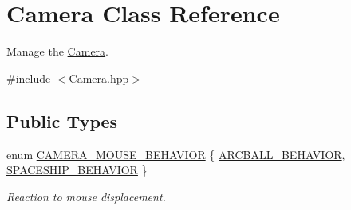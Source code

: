 \hypertarget{classCamera}{\section{Camera Class Reference}
\label{classCamera}
}


Manage the \hyperlink{classCamera}{Camera}.  




{\ttfamily \#include $<$Camera.\+hpp$>$}

\subsection*{Public Types}
\begin{DoxyCompactItemize}
\item 
enum \hyperlink{classCamera_a39b92a45686a6f858a3405ee34a95cfa}{C\+A\+M\+E\+R\+A\+\_\+\+M\+O\+U\+S\+E\+\_\+\+B\+E\+H\+A\+V\+I\+O\+R} \{ \hyperlink{classCamera_a39b92a45686a6f858a3405ee34a95cfaa8554ee8f8de95ea3a84d77e3e8345d1c}{A\+R\+C\+B\+A\+L\+L\+\_\+\+B\+E\+H\+A\+V\+I\+O\+R}, 
\hyperlink{classCamera_a39b92a45686a6f858a3405ee34a95cfaa37a95995e7b876b0b9994a131da60717}{S\+P\+A\+C\+E\+S\+H\+I\+P\+\_\+\+B\+E\+H\+A\+V\+I\+O\+R}
 \}
\begin{DoxyCompactList}\small\item\em Reaction to mouse displacement. \end{DoxyCompactList}\end{DoxyCompactItemize}
